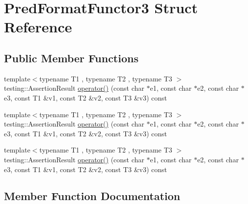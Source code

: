 \hypertarget{struct_pred_format_functor3}{}\section{Pred\+Format\+Functor3 Struct Reference}
\label{struct_pred_format_functor3}
\subsection*{Public Member Functions}
\begin{DoxyCompactItemize}
\item 
{\footnotesize template$<$typename T1 , typename T2 , typename T3 $>$ }\\testing\+::\+Assertion\+Result \mbox{\hyperlink{struct_pred_format_functor3_a35575b0ed1e572d3a31603b07a3f6b30}{operator()}} (const char $\ast$e1, const char $\ast$e2, const char $\ast$e3, const T1 \&v1, const T2 \&v2, const T3 \&v3) const
\item 
{\footnotesize template$<$typename T1 , typename T2 , typename T3 $>$ }\\testing\+::\+Assertion\+Result \mbox{\hyperlink{struct_pred_format_functor3_a35575b0ed1e572d3a31603b07a3f6b30}{operator()}} (const char $\ast$e1, const char $\ast$e2, const char $\ast$e3, const T1 \&v1, const T2 \&v2, const T3 \&v3) const
\item 
{\footnotesize template$<$typename T1 , typename T2 , typename T3 $>$ }\\testing\+::\+Assertion\+Result \mbox{\hyperlink{struct_pred_format_functor3_a35575b0ed1e572d3a31603b07a3f6b30}{operator()}} (const char $\ast$e1, const char $\ast$e2, const char $\ast$e3, const T1 \&v1, const T2 \&v2, const T3 \&v3) const
\end{DoxyCompactItemize}


\subsection{Member Function Documentation}
\mbox{\label{struct_pred_format_functor3_a35575b0ed1e572d3a31603b07a3f6b30}} 
